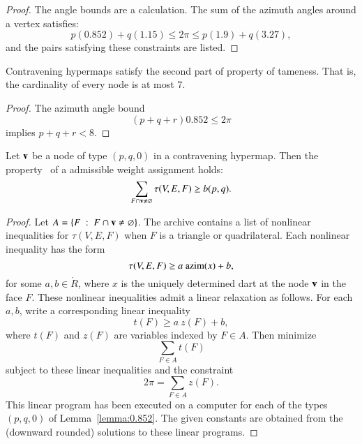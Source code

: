 \begin{proof}
The angle bounds are a calculation.  The sum of the azimuth angles
around a vertex satisfies:
$$
  p (0.852) + q (1.15) \le 2\pi \le p (1.9) + q (3.27),
$$
and the pairs satisfying these constraints are listed.
\end{proof}

\begin{lemma}\label{lemma:node-upper}
Contravening hypermaps satisfy the second part of property 
of tameness.  That is, the cardinality of every
node is at most $7$.
\end{lemma}

\begin{proof}  The azimuth angle bound
$$
 (p+q+r) 0.852 \le 2\pi
$$
implies $p+q+r < 8$.
\end{proof}




\begin{lemma} \label{lemma:weightB}
Let ${\mathbf v}$ be a node of type $(p,q,0)$ in a contravening hypermap.    Then the property~ of a admissible weight assignment holds:
$$
\sum_{ F\cap {\mathbf v}\ne \varnothing} \tau(V,E,F) \ge  b(p,q).
$$
\end{lemma}
%
%
%

\begin{proof} Let $A =\{F\ :\  F\cap {\mathbf v}\ne\varnothing\}$.  The archive \cite[FUSDSPJ]{hales:2009:nonlinear} contains a list of nonlinear inequalities
for $\tau(V,E,F)$ when $F$ is a triangle or quadrilateral. Each nonlinear inequality has the form
%
$$\tau(V,E,F) \ge a~{\operatorname{azim}}(x) + b,$$
for some $a,b\in\ring{R}$, where $x$ is the uniquely determined dart at the node ${\mathbf v}$ in the face $F$.  These nonlinear inequalities admit a linear relaxation as follows.  For each $a,b$,  write a corresponding linear inequality
%
%
%
$$
t(F) \ge a~z(F) + b,
$$
where $t(F)$ and $z(F)$ are variables indexed by $F\in A$.
%
%
%
Then  minimize 
$$\sum_{F\in A} t(F)$$
subject to these linear inequalities and the constraint
$$
2\pi = \sum_{F\in A} z(F).
$$
This linear program has been executed on a computer for each of the types $(p,q,0)$ of Lemma~\ref{lemma:0.852}. The given constants are obtained from the (downward rounded) solutions to these linear programs.
\end{proof}


